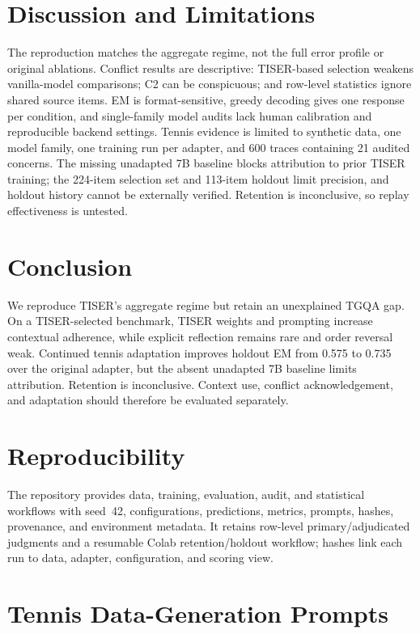 \documentclass[conference]{IEEEtran}
\begin{document}
\section{Discussion and Limitations}

The reproduction matches the aggregate regime, not the full error profile or original ablations. Conflict results are descriptive: TISER-based selection weakens vanilla-model comparisons; C2 can be conspicuous; and row-level statistics ignore shared source items. EM is format-sensitive, greedy decoding gives one response per condition, and single-family model audits lack human calibration and reproducible backend settings. Tennis evidence is limited to synthetic data, one model family, one training run per adapter, and 600 traces containing 21 audited concerns. The missing unadapted 7B baseline blocks attribution to prior TISER training; the 224-item selection set and 113-item holdout limit precision, and holdout history cannot be externally verified. Retention is inconclusive, so replay effectiveness is untested.

\section{Conclusion}

We reproduce TISER's aggregate regime but retain an unexplained TGQA gap. On a TISER-selected benchmark, TISER weights and prompting increase contextual adherence, while explicit reflection remains rare and order reversal weak. Continued tennis adaptation improves holdout EM from 0.575 to 0.735 over the original adapter, but the absent unadapted 7B baseline limits attribution. Retention is inconclusive. Context use, conflict acknowledgement, and adaptation should therefore be evaluated separately.

\newpage
\section{Reproducibility}

The repository provides data, training, evaluation, audit, and statistical workflows with seed~42, configurations, predictions, metrics, prompts, hashes, provenance, and environment metadata. It retains row-level primary/adjudicated judgments and a resumable Colab retention/holdout workflow; hashes link each run to data, adapter, configuration, and scoring view.

\clearpage
\onecolumn
\appendices

\section{Tennis Data-Generation Prompts}
\label{app:tennis-prompts}
\end{document}
